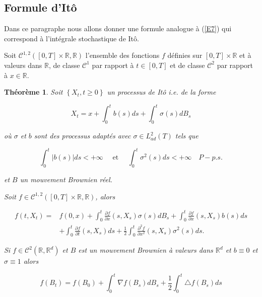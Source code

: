 \documentclass[A4paper,12pt]{report}
\newtheorem{theorem}{Th\'eor\`eme}[chapter]
\begin{document}
\subsection{Formule d'Itô}
Dans ce paragraphe nous allons donner une formule analogue à (\ref{E7}) qui correspond à l'intégrale stochastique de Itô.

Soit $\mathcal{C}^{1,2}([0, T] \times \mathbb{R}, \mathbb{R})$ l'ensemble des fonctions $f$ définies sur $[0, T] \times \mathbb{R}$ et à valeurs dans $\mathbb{R}$, de classe $\mathcal{C}^{1}$ par rapport à $t \in[0, T]$ et de classe $\mathcal{C}^{2}$ par rapport à $x \in \mathbb{R}$.
\begin{theorem}
Soit $\left\{X_{t}, t \geq 0\right\}$ un processus de Itô i.e. de la forme

$$
X_{t}=x+\int_{0}^{t} b(s) d s+\int_{0}^{t} \sigma(s) d B_{s}
$$

où $\sigma$ et $b$ sont des processus adaptés avec $\sigma \in L_{a d}^{2}(T)$ tels que

$$
\int_{0}^{t}|b(s)| d s<+\infty \quad \text { et } \quad \int_{0}^{t} \sigma^{2}(s) d s<+\infty \quad P-p . s .
$$

et $B$ un mouvement Brownien réel.

Soit $f \in \mathcal{C}^{1,2}([0, T] \times \mathbb{R}, \mathbb{R})$, alors

\begin{equation}\label{E9}
\begin{aligned}
f\left(t, X_{t}\right)= & f(0, x)+\int_{0}^{t} \frac{\partial f}{\partial x}\left(s, X_{s}\right) \sigma(s) d B_{s}+\int_{0}^{t} \frac{\partial f}{\partial x}\left(s, X_{s}\right) b(s) d s \\
& +\int_{0}^{t} \frac{\partial f}{\partial t}\left(s, X_{s}\right) d s+\frac{1}{2} \int_{0}^{t} \frac{\partial^{2} f}{\partial x^{2}}\left(s, X_{s}\right) \sigma^{2}(s) d s .
\end{aligned}
\end{equation}

Si $f \in \mathcal{C}^{2}\left(\mathbb{R}, \mathbb{R}^{d}\right)$ et $B$ est un mouvement Brownien à valeurs dans $\mathbb{R}^{d}$ et $b \equiv 0$ et $\sigma \equiv 1$ alors

\begin{equation}\label{E10}
f\left(B_{t}\right)=f\left(B_{0}\right)+\int_{0}^{t} \nabla f\left(B_{s}\right) d B_{s}+\frac{1}{2} \int_{0}^{t} \triangle f\left(B_{s}\right) d s
\end{equation}

\end{theorem}
\end{document}
